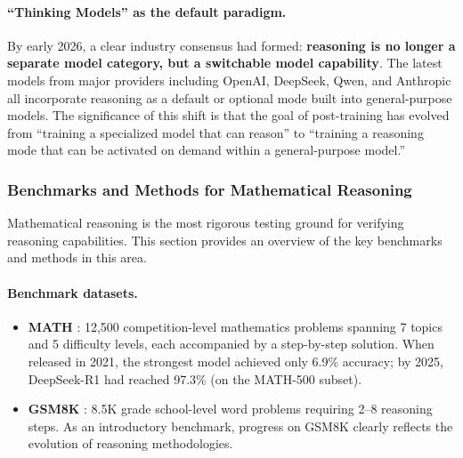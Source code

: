 \paragraph{``Thinking Models'' as the default paradigm.}
By early 2026, a clear industry consensus had formed:
\textbf{reasoning is no longer a separate model category, but a switchable model capability}.
The latest models from major providers including OpenAI, DeepSeek, Qwen, and Anthropic
all incorporate reasoning as a default or optional mode built into general-purpose models.
The significance of this shift is that
the goal of post-training has evolved from ``training a specialized model that can reason''
to ``training a reasoning mode that can be activated on demand within a general-purpose model.''

\subsubsection{Benchmarks and Methods for Mathematical Reasoning}
\label{sec:t4-math}

Mathematical reasoning is the most rigorous testing ground for verifying reasoning capabilities.
This section provides an overview of the key benchmarks and methods in this area.

\paragraph{Benchmark datasets.}
\begin{itemize}[leftmargin=2em]
  \item \textbf{MATH} :
    12,500 competition-level mathematics problems spanning 7 topics and 5 difficulty levels,
    each accompanied by a step-by-step solution.
    When released in 2021, the strongest model achieved only 6.9\% accuracy;
    by 2025, DeepSeek-R1 had reached 97.3\% (on the MATH-500 subset).

  \item \textbf{GSM8K} \cite{cobbe2021gsm8k}:
    8.5K grade school-level word problems requiring 2--8 reasoning steps.
    As an introductory benchmark, progress on GSM8K clearly reflects the evolution of reasoning methodologies.
\end{itemize}


